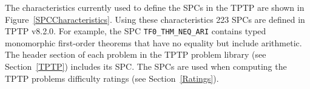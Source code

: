 \documentclass[runningheads]{llncs}
\begin{document}
The characteristics currently used to define the SPCs in the TPTP are shown in 
Figure~\ref{SPCCharacteristics}.
Using these characteristics 223 SPCs are defined in TPTP v8.2.0. 
For example, the SPC
{\tt TF0\_THM\_NEQ\_ARI} contains typed monomorphic first-order theorems that have no equality but 
include arithmetic.
The header section of each problem in the TPTP problem library (see Section~\ref{TPTP}) includes 
its SPC.
The SPCs are used when computing the TPTP problems difficulty ratings (see Section~\ref{Ratings}).
\end{document}
